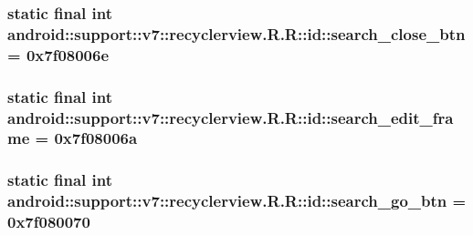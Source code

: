 \hypertarget{classandroid_1_1support_1_1v7_1_1recyclerview_1_1_r_1_1id_b036192a10eb003101f437fc4ecdf9cd}{
\subsubsection[{search\_\-close\_\-btn}]{\setlength{\rightskip}{0pt plus 5cm}static final int android::support::v7::recyclerview.R.R::id::search\_\-close\_\-btn = 0x7f08006e}}
\label{classandroid_1_1support_1_1v7_1_1recyclerview_1_1_r_1_1id_b036192a10eb003101f437fc4ecdf9cd}


\hypertarget{classandroid_1_1support_1_1v7_1_1recyclerview_1_1_r_1_1id_47dc76d2602c0b9966f0a38699db415f}{
\subsubsection[{search\_\-edit\_\-frame}]{\setlength{\rightskip}{0pt plus 5cm}static final int android::support::v7::recyclerview.R.R::id::search\_\-edit\_\-frame = 0x7f08006a}}
\label{classandroid_1_1support_1_1v7_1_1recyclerview_1_1_r_1_1id_47dc76d2602c0b9966f0a38699db415f}


\hypertarget{classandroid_1_1support_1_1v7_1_1recyclerview_1_1_r_1_1id_263323225c173f29e2d543adeedbff2a}{
\subsubsection[{search\_\-go\_\-btn}]{\setlength{\rightskip}{0pt plus 5cm}static final int android::support::v7::recyclerview.R.R::id::search\_\-go\_\-btn = 0x7f080070}}
\label{classandroid_1_1support_1_1v7_1_1recyclerview_1_1_r_1_1id_263323225c173f29e2d543adeedbff2a}


